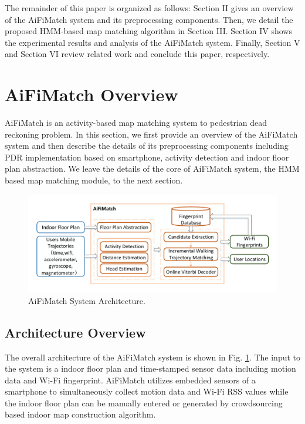 \documentclass[conference]{IEEEtran}
\begin{document}
The remainder of this paper is organized as follows: Section II gives an overview of the AiFiMatch system and its preprocessing components. Then, we detail the proposed HMM-based map matching algorithm in Section III. Section IV shows the experimental results and analysis of the AiFiMatch system. Finally, Section V and Section VI review related work and conclude this paper, respectively.

\section{AiFiMatch Overview}

AiFiMatch is an activity-based map matching system to pedestrian dead reckoning problem. In this section, we first provide an overview of the AiFiMatch system and then describe the details of its preprocessing components including PDR implementation based on smartphone, activity detection and indoor floor plan abstraction. We leave the details of the core of AiFiMatch system, the HMM based map matching module, to the next section.

\begin{figure}[htbp]
	\centerline{\includegraphics[width=5.85in]{AiFiMatch-Architecture}}
	\caption{AiFiMatch System Architecture.}
	\label{fig-architecture}
\end{figure}

\subsection{Architecture Overview}

The overall architecture of the AiFiMatch system is shown in Fig. \ref{fig-architecture}. The input to the system is a indoor floor plan and time-stamped sensor data including motion data and Wi-Fi fingerprint. AiFiMatch utilizes embedded sensors of a smartphone to simultaneously collect motion data and Wi-Fi RSS values while the indoor floor plan can be manually entered or generated by crowdsourcing based indoor map construction algorithm.
\end{document}
